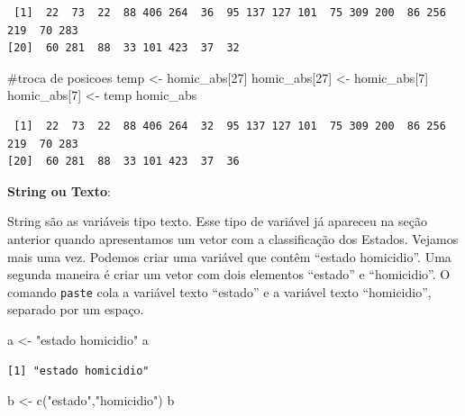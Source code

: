 \documentclass[
  letterpaper,
  DIV=11,
  numbers=noendperiod]{scrreprt}
\newenvironment{Shaded}{\begin{snugshade}}{\end{snugshade}}
\newcommand{\CommentTok}[1]{\textcolor[rgb]{0.37,0.37,0.37}{#1}}
\newcommand{\DecValTok}[1]{\textcolor[rgb]{0.68,0.00,0.00}{#1}}
\newcommand{\FunctionTok}[1]{\textcolor[rgb]{0.28,0.35,0.67}{#1}}
\newcommand{\NormalTok}[1]{\textcolor[rgb]{0.00,0.23,0.31}{#1}}
\newcommand{\OtherTok}[1]{\textcolor[rgb]{0.00,0.23,0.31}{#1}}
\newcommand{\StringTok}[1]{\textcolor[rgb]{0.13,0.47,0.30}{#1}}
\begin{document}
\begin{verbatim}
 [1]  22  73  22  88 406 264  36  95 137 127 101  75 309 200  86 256 219  70 283
[20]  60 281  88  33 101 423  37  32
\end{verbatim}

\begin{Shaded}
\begin{Highlighting}[]
\CommentTok{\#troca de posicoes}
\NormalTok{temp }\OtherTok{\textless{}{-}}\NormalTok{ homic\_abs[}\DecValTok{27}\NormalTok{]}
\NormalTok{homic\_abs[}\DecValTok{27}\NormalTok{] }\OtherTok{\textless{}{-}}\NormalTok{ homic\_abs[}\DecValTok{7}\NormalTok{]}
\NormalTok{homic\_abs[}\DecValTok{7}\NormalTok{] }\OtherTok{\textless{}{-}}\NormalTok{ temp}
\NormalTok{homic\_abs}
\end{Highlighting}
\end{Shaded}

\begin{verbatim}
 [1]  22  73  22  88 406 264  32  95 137 127 101  75 309 200  86 256 219  70 283
[20]  60 281  88  33 101 423  37  36
\end{verbatim}

\textbf{String ou Texto}:

String são as variáveis tipo texto. Esse tipo de variável já apareceu na
seção anterior quando apresentamos um vetor com a classificação dos
Estados. Vejamos mais uma vez. Podemos criar uma variável que contêm
``estado homicidio''. Uma segunda maneira é criar um vetor com dois
elementos ``estado'' e ``homicidio''. O comando \texttt{paste} cola a
variável texto ``estado'' e a variável texto ``homicidio'', separado por
um espaço.

\begin{Shaded}
\begin{Highlighting}[]
\NormalTok{a }\OtherTok{\textless{}{-}} \StringTok{"estado homicidio"}
\NormalTok{a}
\end{Highlighting}
\end{Shaded}

\begin{verbatim}
[1] "estado homicidio"
\end{verbatim}

\begin{Shaded}
\begin{Highlighting}[]
\NormalTok{b }\OtherTok{\textless{}{-}} \FunctionTok{c}\NormalTok{(}\StringTok{"estado"}\NormalTok{,}\StringTok{"homicidio"}\NormalTok{)}
\NormalTok{b}
\end{Highlighting}
\end{Shaded}
\end{document}
